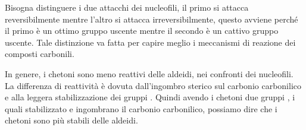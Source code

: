 Bisogna distinguere i due attacchi dei nucleofili, il primo si attacca reversibilmente mentre l'altro si attacca irreversibilmente, questo avviene perché il primo è un ottimo gruppo uscente mentre il secondo è un cattivo gruppo uscente. Tale distinzione va fatta per capire meglio i meccanismi di reazione dei composti carbonili.

In genere, i chetoni sono meno reattivi delle aldeidi, nei confronti dei nucleofili. La differenza di reattività è dovuta dall'ingombro sterico sul carbonio carbonilico e alla leggera stabilizzazione dei gruppi . Quindi avendo i chetoni due gruppi , i quali stabilizzato e ingombrano il carbonio carbonilico, possiamo dire che i chetoni sono più stabili delle aldeidi.
